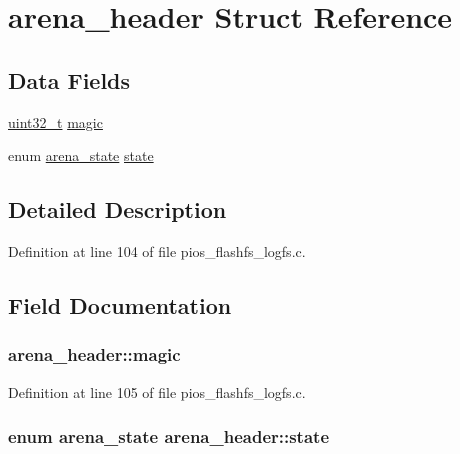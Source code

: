 \hypertarget{structarena__header}{\section{arena\-\_\-header Struct Reference}
\label{structarena__header}
}
\subsection*{Data Fields}
\begin{DoxyCompactItemize}
\item 
\hyperlink{stdint_8h_a435d1572bf3f880d55459d9805097f62}{uint32\-\_\-t} \hyperlink{structarena__header_a1e22aa4ce6a8f4c1bcfda08c0fd02071}{magic}
\item 
enum \hyperlink{group___p_i_o_s___f_l_a_s_h_f_s_gaa936149cfd5559190d20879c10e0fcee}{arena\-\_\-state} \hyperlink{structarena__header_a5e4eba89d3d72203e7dd0a324da74689}{state}
\end{DoxyCompactItemize}


\subsection{Detailed Description}


Definition at line 104 of file pios\-\_\-flashfs\-\_\-logfs.\-c.



\subsection{Field Documentation}
\hypertarget{structarena__header_a1e22aa4ce6a8f4c1bcfda08c0fd02071}{
\subsubsection[{magic}]{ arena\-\_\-header\-::magic}}\label{structarena__header_a1e22aa4ce6a8f4c1bcfda08c0fd02071}


Definition at line 105 of file pios\-\_\-flashfs\-\_\-logfs.\-c.

\hypertarget{structarena__header_a5e4eba89d3d72203e7dd0a324da74689}{
\subsubsection[{state}]{\setlength{\rightskip}{0pt plus 5cm}enum {\bf arena\-\_\-state} arena\-\_\-header\-::state}}\label{structarena__header_a5e4eba89d3d72203e7dd0a324da74689}


